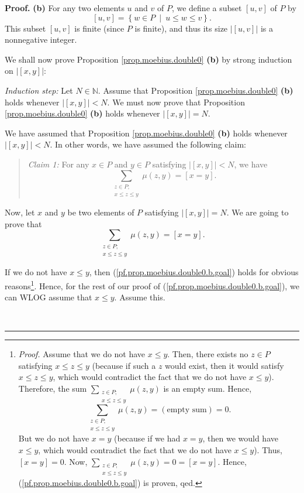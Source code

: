 \documentclass[numbers=enddot,12pt,final,onecolumn,notitlepage]{scrartcl}%
\theoremstyle{definition}
\newenvironment{statement}{\begin{quote}}{\end{quote}}
\newenvironment{proof}[1][Proof]{\noindent\textbf{#1.} }{\ \rule{0.5em}{0.5em}}
\newenvironment{verlong}{}{}
\let\sumnonlimits\sum
\renewcommand{\sum}{\sumnonlimits\limits}
\begin{document}
\begin{verlong}
\begin{proof}
\textbf{(b)} For any two elements $u$ and $v$ of $P$, we define a subset
$\left[  u,v\right]  $ of $P$ by%
\[
\left[  u,v\right]  =\left\{  w\in P\ \mid\ u\leq w\leq v\right\}  .
\]
This subset $\left[  u,v\right]  $ is finite (since $P$ is finite), and thus
its size $\left\vert \left[  u,v\right]  \right\vert $ is a nonnegative integer.

We shall now prove Proposition \ref{prop.moebius.double0} \textbf{(b)} by
strong induction on $\left\vert \left[  x,y\right]  \right\vert $:

\textit{Induction step:} Let $N\in\mathbb{N}$. Assume that Proposition
\ref{prop.moebius.double0} \textbf{(b)} holds whenever $\left\vert \left[
x,y\right]  \right\vert <N$. We must now prove that Proposition
\ref{prop.moebius.double0} \textbf{(b)} holds whenever $\left\vert \left[
x,y\right]  \right\vert =N$.

We have assumed that Proposition \ref{prop.moebius.double0} \textbf{(b)} holds
whenever $\left\vert \left[  x,y\right]  \right\vert <N$. In other words, we
have assumed the following claim:

\begin{statement}
\textit{Claim 1:} For any $x\in P$ and $y\in P$ satisfying $\left\vert \left[
x,y\right]  \right\vert <N$, we have%
\[
\sum_{\substack{z\in P;\\x\leq z\leq y}}\mu\left(  z,y\right)  =\left[
x=y\right]  .
\]

\end{statement}

Now, let $x$ and $y$ be two elements of $P$ satisfying $\left\vert \left[
x,y\right]  \right\vert =N$. We are going to prove that%
\begin{equation}
\sum_{\substack{z\in P;\\x\leq z\leq y}}\mu\left(  z,y\right)  =\left[
x=y\right]  . \label{pf.prop.moebius.double0.b.goal}%
\end{equation}


If we do not have $x\leq y$, then (\ref{pf.prop.moebius.double0.b.goal}) holds
for obvious reasons\footnote{\textit{Proof.} Assume that we do not have $x\leq
y$. Then, there exists no $z\in P$ satisfying $x\leq z\leq y$ (because if such
a $z$ would exist, then it would satisfy $x\leq z\leq y$, which would
contradict the fact that we do not have $x\leq y$). Therefore, the sum
$\sum_{\substack{z\in P;\\x\leq z\leq y}}\mu\left(  z,y\right)  $ is an empty
sum. Hence,%
\[
\sum_{\substack{z\in P;\\x\leq z\leq y}}\mu\left(  z,y\right)  =\left(
\text{empty sum}\right)  =0.
\]
But we do not have $x=y$ (because if we had $x=y$, then we would have $x\leq
y$, which would contradict the fact that we do not have $x\leq y$). Thus,
$\left[  x=y\right]  =0$. Now, $\sum_{\substack{z\in P;\\x\leq z\leq y}%
}\mu\left(  z,y\right)  =0=\left[  x=y\right]  $. Hence,
(\ref{pf.prop.moebius.double0.b.goal}) is proven, qed.}. Hence, for the rest
of our proof of (\ref{pf.prop.moebius.double0.b.goal}), we can WLOG assume
that $x\leq y$. Assume this.


\end{proof}
\end{verlong}
\end{document}
